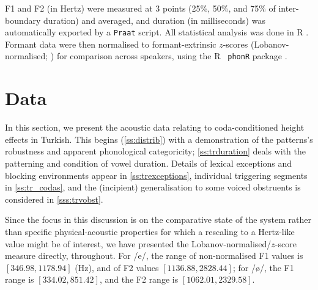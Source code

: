 F1 and F2 (in Hertz) were measured at 3 points (25\%, 50\%, and 75\% of inter-boundary duration) and averaged, and duration (in milliseconds) was automatically exported by a \texttt{Praat} script. All statistical analysis was done in R \citep{R}. Formant data were then normalised to formant-extrinsic $z$-scores (Lobanov-normalised; \citealt{Lobanov1971, Adank2004}) for comparison across speakers, using the R \texttt{ phonR} package \citep{phonR}.

\section{Data}\label{s:trdata}

In this section, we present the acoustic data relating to coda-conditioned height effects in Turkish. This begins (\cref{ss:distrib}) with a demonstration of the patterns's robustness and apparent phonological categoricity; \cref{ss:trduration} deals with the patterning and condition of vowel duration. Details of lexical exceptions and blocking environments appear in  \cref{ss:trexceptions}, individual triggering segments in \cref{ss:tr_codas}, and the (incipient) generalisation to some voiced obstruents is considered in \cref{sss:trvobst}.

Since the focus in this discussion is on the comparative state of the system rather than specific physical-acoustic properties for which a rescaling to a Hertz-like value might be of interest, we have presented the Lobanov-normalised/$z$-score measure directly, throughout. For /e/, the range of non-normalised F1 values is $[346.98,1178.94]$ (Hz), and of F2 values $[1136.88,2828.44]$; for /ø/, the F1 range is $[334.02, 851.42]$, and the F2 range is $[1062.01, 2329.58]$.

